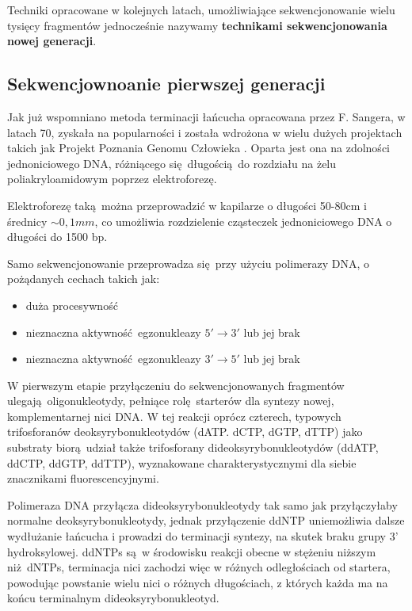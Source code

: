 \documentclass[two column, twoside, a4paper]{article}
\begin{document}
Techniki opracowane w kolejnych latach, umożliwiające sekwencjonowanie wielu tysięcy fragmentów jednocześnie nazywamy \textbf{technikami sekwencjonowania nowej generacji}.

\subsection{Sekwencjownoanie pierwszej generacji}

Jak już wspomniano metoda terminacji łańcucha opracowana przez F. Sangera, w latach 70, zyskała na popularności i została wdrożona w wielu dużych projektach takich jak Projekt Poznania Genomu Człowieka \autocite{IHGSC2001}. Oparta jest ona na zdolności jednoniciowego DNA, różniącego się długością do rozdziału na żelu poliakryloamidowym poprzez elektroforezę.

Elektroforezę taką można przeprowadzić w kapilarze o długości 50-80cm i średnicy $\sim 0,1mm$, co umożliwia rozdzielenie cząsteczek jednoniciowego DNA o długości do 1500 bp.

Samo sekwencjonowanie przeprowadza się przy użyciu polimerazy DNA, o pożądanych cechach takich jak:
\begin{itemize}
\item duża procesywność
\item nieznaczna aktywność egzonukleazy $5'\rightarrow3'$ lub jej brak
\item nieznaczna aktywność egzonukleazy $3'\rightarrow5'$ lub jej brak
\end{itemize}

W pierwszym etapie przyłączeniu do sekwencjonowanych fragmentów ulegają oligonukleotydy, pełniące rolę starterów dla syntezy nowej, komplementarnej nici DNA. W tej reakcji oprócz czterech, typowych trifosforanów deoksyrybonukleotydów (dATP. dCTP, dGTP, dTTP) jako substraty biorą udział także trifosforany dideoksyrybonukleotydów (ddATP, ddCTP, ddGTP, ddTTP), wyznakowane charakterystycznymi dla siebie znacznikami fluorescencyjnymi.

Polimeraza DNA przyłącza dideoksyrybonukleotydy tak samo jak przyłączyłaby normalne deoksyrybonukleotydy, jednak przyłączenie ddNTP uniemożliwia dalsze wydłużanie łańcucha i prowadzi do terminacji syntezy, na skutek braku grupy 3' hydroksylowej. ddNTPs są w środowisku reakcji obecne w stężeniu niższym niż dNTPs, terminacja nici zachodzi więc w różnych odległościach od startera, powodując powstanie wielu nici o różnych długościach, z których każda ma na końcu terminalnym dideoksyrybonukleotyd.
\end{document}
